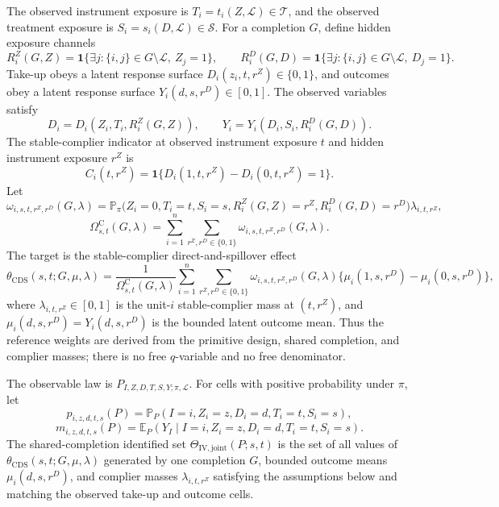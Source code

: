\documentclass[11pt]{article}
\newcommand{\E}{\mathbb{E}}
\renewcommand{\Pr}{\mathbb{P}}
\newcommand{\one}{\mathbf{1}}
\theoremstyle{definition}
\theoremstyle{plain}
\theoremstyle{remark}
\begin{document}
The observed instrument exposure is \(T_i=t_i(Z,\mathcal L)\in\mathcal T\), and the observed treatment exposure is \(S_i=s_i(D,\mathcal L)\in\mathcal S\). For a completion \(G\), define hidden exposure channels
\[
R_i^Z(G,Z)=\one\{\exists j:\{i,j\}\in G\setminus\mathcal L,\ Z_j=1\}, \qquad
R_i^D(G,D)=\one\{\exists j:\{i,j\}\in G\setminus\mathcal L,\ D_j=1\}.
\]
Take-up obeys a latent response surface \(D_i(z_i,t,r^Z)\in\{0,1\}\), and outcomes obey a latent response surface \(Y_i(d,s,r^D)\in[0,1]\). The observed variables satisfy
\[
D_i = D_i(Z_i,T_i,R_i^Z(G,Z)), \qquad Y_i = Y_i(D_i,S_i,R_i^D(G,D)).
\]
The stable-complier indicator at observed instrument exposure \(t\) and hidden instrument exposure \(r^Z\) is
\[
C_i(t,r^Z)=\one\{D_i(1,t,r^Z)-D_i(0,t,r^Z)=1\}.
\]
\noindent Let
\[
\omega_{i,s,t,r^Z,r^D}(G,\lambda)
=
\Pr_\pi\!\bigl(Z_i=0,T_i=t,S_i=s,R_i^Z(G,Z)=r^Z,R_i^D(G,D)=r^D\bigr)\lambda_{i,t,r^Z},
\]
\[
\Omega^{\mathrm C}_{s,t}(G,\lambda)
=
\sum_{i=1}^n\sum_{r^Z,r^D\in\{0,1\}}
\omega_{i,s,t,r^Z,r^D}(G,\lambda).
\]
The target is the stable-complier direct-and-spillover effect
\[
\theta_{\mathrm{CDS}}(s,t;G,\mu,\lambda)
=
\frac{1}{\Omega^{\mathrm C}_{s,t}(G,\lambda)}
\sum_{i=1}^n \sum_{r^Z,r^D\in\{0,1\}}
\omega_{i,s,t,r^Z,r^D}(G,\lambda)
\{\mu_i(1,s,r^D)-\mu_i(0,s,r^D)\},
\]
where \(\lambda_{i,t,r^Z}\in[0,1]\) is the unit-\(i\) stable-complier mass at \((t,r^Z)\), and \(\mu_i(d,s,r^D)=Y_i(d,s,r^D)\) is the bounded latent outcome mean. Thus the reference weights are derived from the primitive design, shared completion, and complier masses; there is no free \(q\)-variable and no free denominator.

The observable law is \(P_{I,Z,D,T,S,Y;\pi,\mathcal L}\). For cells with positive probability under \(\pi\), let
\[
p_{i,z,d,t,s}(P)=\Pr_P(I=i,Z_i=z,D_i=d,T_i=t,S_i=s),
\]
\[
m_{i,z,d,t,s}(P)=\E_P(Y_I\mid I=i,Z_i=z,D_i=d,T_i=t,S_i=s).
\]
The shared-completion identified set \(\Theta_{\mathrm{IV,joint}}(P;s,t)\) is the set of all values of \(\theta_{\mathrm{CDS}}(s,t;G,\mu,\lambda)\) generated by one completion \(G\), bounded outcome means \(\mu_i(d,s,r^D)\), and complier masses \(\lambda_{i,t,r^Z}\) satisfying the assumptions below and matching the observed take-up and outcome cells.
\end{document}

